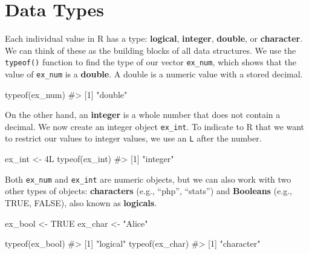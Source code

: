 \documentclass[
  letterpaper,
]{latex/krantz}
\makeatletter
\newenvironment{Shaded}{\begin{snugshade}}{\end{snugshade}}
\newcommand{\CommentTok}[1]{\textcolor[rgb]{0.37,0.37,0.37}{#1}}
\newcommand{\ConstantTok}[1]{\textcolor[rgb]{0.56,0.35,0.01}{#1}}
\newcommand{\DecValTok}[1]{\textcolor[rgb]{0.68,0.00,0.00}{#1}}
\newcommand{\FunctionTok}[1]{\textcolor[rgb]{0.28,0.35,0.67}{#1}}
\newcommand{\NormalTok}[1]{\textcolor[rgb]{0.00,0.23,0.31}{#1}}
\newcommand{\OtherTok}[1]{\textcolor[rgb]{0.00,0.23,0.31}{#1}}
\newcommand{\StringTok}[1]{\textcolor[rgb]{0.13,0.47,0.30}{#1}}
\newenvironment{kframe}{%
\medskip{}
\setlength{\fboxsep}{.8em}
 \def\at@end@of@kframe{}%
 \ifinner\ifhmode%
  \def\at@end@of@kframe{\end{minipage}}%
  \begin{minipage}{\columnwidth}%
 \fi\fi%
 \def\FrameCommand##1{\hskip\@totalleftmargin \hskip-\fboxsep
 \colorbox{shadecolor}{##1}\hskip-\fboxsep
     \hskip-\linewidth \hskip-\@totalleftmargin \hskip\columnwidth}%
 \MakeFramed {\advance\hsize-\width
   \@totalleftmargin\z@ \linewidth\hsize
   \@setminipage}}%
 {\par\unskip\endMakeFramed%
 \at@end@of@kframe}
\renewenvironment{Shaded}{\begin{kframe}}{\end{kframe}}
\makeatother
\begin{document}
\section{\texorpdfstring{Data Types
}{Data Types }}\label{data-types}

Each individual value in R has a type: \textbf{logical},
\textbf{integer}, \textbf{double}, or \textbf{character}. We can think
of these as the building blocks of all data structures. We use the
\texttt{typeof()} function
to find the type of our vector \texttt{ex\_num}, which shows that the
value of \texttt{ex\_num} is a \textbf{double}.
A double is a numeric value with a stored decimal.

\begin{Shaded}
\begin{Highlighting}[]
\FunctionTok{typeof}\NormalTok{(ex\_num)}
\CommentTok{\#\textgreater{} [1] "double"}
\end{Highlighting}
\end{Shaded}

On the other hand, an \textbf{integer} is a
whole number that does not contain a decimal. We now create an integer
object \texttt{ex\_int}. To indicate to R that we want to restrict our
values to integer values, we use an \texttt{L} after the number.

\begin{Shaded}
\begin{Highlighting}[]
\NormalTok{ex\_int }\OtherTok{\textless{}{-}} \DecValTok{4}\NormalTok{L}
\FunctionTok{typeof}\NormalTok{(ex\_int)}
\CommentTok{\#\textgreater{} [1] "integer"}
\end{Highlighting}
\end{Shaded}

Both \texttt{ex\_num} and \texttt{ex\_int} are numeric objects, but we
can also work with two other types of objects:
\textbf{characters} (e.g., ``php'',
``stats'') and \textbf{Booleans} (e.g., TRUE,
FALSE), also known as \textbf{logicals}.

\begin{Shaded}
\begin{Highlighting}[]
\NormalTok{ex\_bool }\OtherTok{\textless{}{-}} \ConstantTok{TRUE}
\NormalTok{ex\_char }\OtherTok{\textless{}{-}} \StringTok{"Alice"}

\FunctionTok{typeof}\NormalTok{(ex\_bool)}
\CommentTok{\#\textgreater{} [1] "logical"}
\FunctionTok{typeof}\NormalTok{(ex\_char)}
\CommentTok{\#\textgreater{} [1] "character"}
\end{Highlighting}
\end{Shaded}
\end{document}
